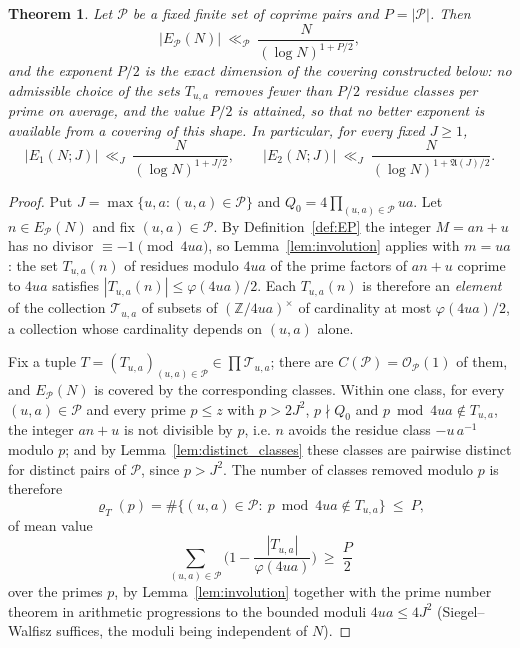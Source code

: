 \documentclass[11pt, a4paper]{article}
\theoremstyle{plain}
\newtheorem{theorem}{Theorem}[section]
\theoremstyle{definition}
\newcommand{\Z}{\mathbb{Z}}
\begin{document}
\begin{theorem}\label{thm:fixed_depth}
Let $\mathcal{P}$ be a fixed finite set of coprime pairs and $P=|\mathcal{P}|$. Then
$$|E_{\mathcal{P}}(N)|\ \ll_{\mathcal{P}}\ \frac{N}{(\log N)^{1+P/2}},$$
and the exponent $P/2$ is the exact dimension of the covering constructed below: no admissible choice of the sets $T_{u,a}$ removes fewer than $P/2$ residue classes per prime on average, and the value $P/2$ is attained, so that no better exponent is available from a covering of this shape. In particular, for every fixed $J\ge1$,
$$|E_1(N;J)|\ \ll_J\ \frac{N}{(\log N)^{1+J/2}},\qquad
|E_2(N;J)|\ \ll_J\ \frac{N}{(\log N)^{1+\mathfrak{A}(J)/2}} .$$
\end{theorem}
\begin{proof}
Put $J=\max\{u,a:(u,a)\in\mathcal{P}\}$ and $Q_0=4\prod_{(u,a)\in\mathcal{P}}ua$. Let $n\in E_{\mathcal{P}}(N)$ and fix $(u,a)\in\mathcal{P}$. By Definition~\ref{def:EP} the integer $M=an+u$ has no divisor $\equiv-1\pmod{4ua}$, so Lemma~\ref{lem:involution} applies with $m=ua$: the set $T_{u,a}(n)$ of residues modulo $4ua$ of the prime factors of $an+u$ coprime to $4ua$ satisfies $|T_{u,a}(n)|\le\varphi(4ua)/2$. Each $T_{u,a}(n)$ is therefore an \emph{element} of the collection $\mathcal{T}_{u,a}$ of subsets of $(\Z/4ua)^{\times}$ of cardinality at most $\varphi(4ua)/2$, a collection whose cardinality depends on $(u,a)$ alone.

Fix a tuple $T=(T_{u,a})_{(u,a)\in\mathcal{P}}\in\prod\mathcal{T}_{u,a}$; there are $C(\mathcal{P})=\mathcal{O}_{\mathcal{P}}(1)$ of them, and $E_{\mathcal{P}}(N)$ is covered by the corresponding classes. Within one class, for every $(u,a)\in\mathcal{P}$ and every prime $p\le z$ with $p>2J^{2}$, $p\nmid Q_0$ and $p\bmod 4ua\notin T_{u,a}$, the integer $an+u$ is not divisible by $p$, i.e. $n$ avoids the residue class $-u\,a^{-1}$ modulo $p$; and by Lemma~\ref{lem:distinct_classes} these classes are pairwise distinct for distinct pairs of $\mathcal{P}$, since $p>J^{2}$. The number of classes removed modulo $p$ is therefore
$$\varrho_T(p)=\#\{(u,a)\in\mathcal{P}:\ p\bmod4ua\notin T_{u,a}\}\ \le\ P,$$
of mean value
$$\sum_{(u,a)\in\mathcal{P}}\Big(1-\frac{|T_{u,a}|}{\varphi(4ua)}\Big)\ \ge\ \frac P2$$
over the primes $p$, by Lemma~\ref{lem:involution} together with the prime number theorem in arithmetic progressions to the bounded moduli $4ua\le 4J^{2}$ (Siegel--Walfisz suffices, the moduli being independent of $N$).


\end{proof}
\end{document}
